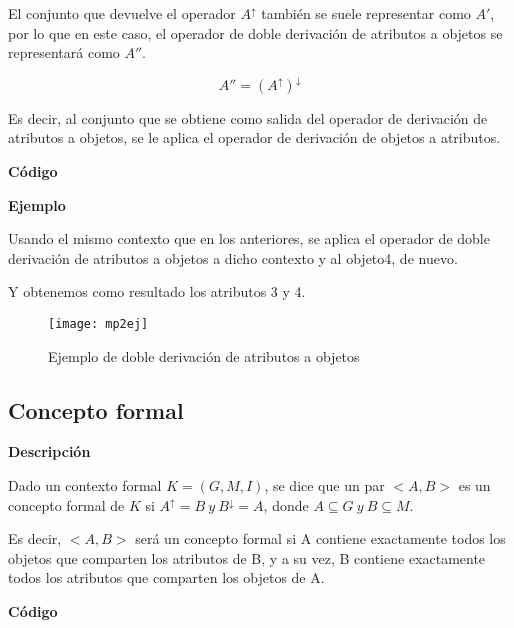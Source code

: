         El conjunto que devuelve el operador \( A^\uparrow \) tambi\'en se suele representar como \( A' \), por lo que en este caso, 
        el operador de doble derivaci\'on de atributos a objetos se representar\'a como \( A'' \).


        \[ A'' = (A^\uparrow)^\downarrow \]

        Es decir, al conjunto que se obtiene como salida del operador de derivaci\'on de atributos a objetos, se le aplica el operador 
        de derivaci\'on de objetos a atributos.


        \bigskip

        \textbf{C\'odigo}

        

        \clearpage

        \textbf{Ejemplo}

        Usando el mismo contexto que en los anteriores, se aplica el operador de doble derivaci\'on de atributos a objetos a dicho 
        contexto y al objeto4, de nuevo.

        Y obtenemos como resultado los atributos 3 y 4.

        \begin{figure}[H]
            \centering
            \texttt{[image: mp2ej]}
            \caption{Ejemplo de doble derivaci\'on de atributos a objetos}
            \label{fig:mp2ej}
        \end{figure}



    \subsection{Concepto formal}

    
        \textbf{Descripci\'on}

        Dado un contexto formal \( K = (G, M, I) \), se dice que un par \( <A,B> \) es un 
        concepto formal de \(K\) si \( A^\uparrow = B ~ y ~ B^\downarrow = A\), donde \( A \subseteq G ~ y ~ B \subseteq M \).
        
        Es decir, \( <A,B> \) ser\'a un concepto formal si A contiene exactamente todos los objetos que comparten los atributos de B, y a su 
        vez, B contiene exactamente todos los atributos que comparten los objetos de A.
        

        \bigskip

        \textbf{C\'odigo}

        


